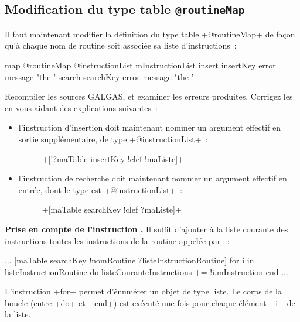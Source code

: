 \subsection{Modification du type table \texttt{@routineMap}}
Il faut maintenant modifier la définition du type table \ggst+@routineMap+ de façon qu'à chaque nom de routine soit associée sa liste d'instructions~:

\begin{galgas3}
map @routineMap {
  @instructionList mInstructionList
  insert insertKey  error message "the '%
  search searchKey error message "the '%
}
\end{galgas3}

Recompiler les sources GALGAS, et examiner les erreurs produites. Corrigez les en vous aidant des explications suivantes~:
\begin{itemize}
  \item l'instruction d'insertion doit maintenant nommer un argument effectif en sortie supplémentaire, de type \ggst+@instructionList+~:
  \begin{description}
    \item[ ] \ggst+[!?maTable insertKey !clef !maListe]+
  \end{description}
  \item l'instruction de recherche doit maintenant nommer un argument effectif en entrée, dont le type est \ggst+@instructionList+~:
  \begin{description}
    \item[ ] \ggst+[maTable searchKey !clef ?maListe]+
  \end{description}
\end{itemize}

{\bf Prise en compte de l'instruction .} Il suffit d'ajouter à la liste courante des instructions toutes les instructions de la routine appelée par ~:
\begin{galgas3}
...
[maTable searchKey !nomRoutine ?listeInstructionRoutine]
for i in listeInstructionRoutine do
  listeCouranteInstructions += !i.mInstruction
end
...
\end{galgas3}

L'instruction \ggst+for+ permet d’énumérer un objet de type liste. Le corps de la boucle (entre \ggst+do+ et \ggst+end+) est exécuté une fois pour chaque élément \ggst+i+ de la liste.








